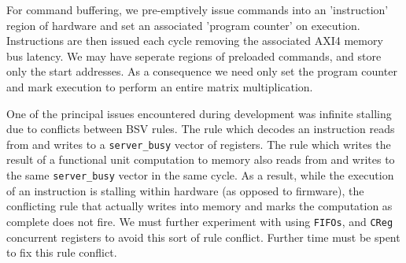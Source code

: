 \documentclass[a4paper,8pt]{report}
\begin{document}



For command buffering, we pre-emptively issue commands into an 'instruction'
region of hardware and set an associated 'program counter' on execution.
Instructions are then issued each cycle removing the associated AXI4 memory bus
latency. We may have seperate regions of preloaded commands, and store only the
start addresses. As a consequence we need only set the program counter and mark
execution to perform an entire matrix multiplication.

One of the principal issues encountered during development was infinite stalling
due to conflicts between BSV rules. The rule which decodes an
instruction reads from and writes to a \texttt{server\_busy} vector of
registers. The rule which writes the result of a functional unit computation to
memory also reads from and writes to the same \texttt{server\_busy} vector in the
same cycle. As a result, while the execution of an instruction is stalling
within hardware (as opposed to firmware), the conflicting rule that actually
writes into memory and marks the computation as complete does not fire. We must
further experiment with using \texttt{FIFOs}, and \texttt{CReg} concurrent registers
to avoid this sort of rule conflict. Further time must be spent to fix this rule
conflict.
\end{document}
